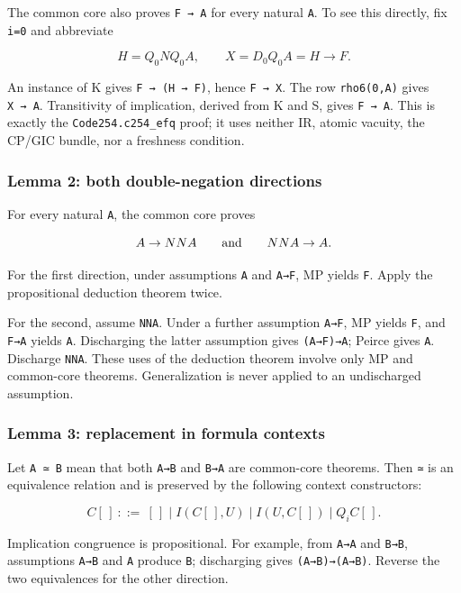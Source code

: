 The common core also proves \texttt{F\ →\ A} for every natural
\texttt{A}. To see this directly, fix \texttt{i=0} and abbreviate

\[
H=Q_0NQ_0A,\qquad X=D_0Q_0A=H\to F.
\]

An instance of K gives \texttt{F\ →\ (H\ →\ F)}, hence \texttt{F\ →\ X}.
The row \texttt{rho6(0,A)} gives \texttt{X\ →\ A}. Transitivity of
implication, derived from K and S, gives \texttt{F\ →\ A}. This is
exactly the \texttt{Code254.c254\_efq} proof; it uses neither IR, atomic
vacuity, the CP/GIC bundle, nor a freshness condition.

\hypertarget{lemma-2-both-double-negation-directions}{%
\subsubsection{Lemma 2: both double-negation
directions}\label{lemma-2-both-double-negation-directions}}

For every natural \texttt{A}, the common core proves

\[
A\to NNA\qquad\hbox{and}\qquad NNA\to A.
\]

For the first direction, under assumptions \texttt{A} and \texttt{A→F},
MP yields \texttt{F}. Apply the propositional deduction theorem twice.

For the second, assume \texttt{NNA}. Under a further assumption
\texttt{A→F}, MP yields \texttt{F}, and \texttt{F→A} yields \texttt{A}.
Discharging the latter assumption gives \texttt{(A→F)→A}; Peirce gives
\texttt{A}. Discharge \texttt{NNA}. These uses of the deduction theorem
involve only MP and common-core theorems. Generalization is never
applied to an undischarged assumption.

\hypertarget{lemma-3-replacement-in-formula-contexts}{%
\subsubsection{Lemma 3: replacement in formula
contexts}\label{lemma-3-replacement-in-formula-contexts}}

Let \texttt{A\ ≃\ B} mean that both \texttt{A→B} and \texttt{B→A} are
common-core theorems. Then \texttt{≃} is an equivalence relation and is
preserved by the following context constructors:

\[
C[\,]\ ::=\ [\,]\mid I(C[\,],U)\mid I(U,C[\,])\mid Q_i C[\,].
\]

Implication congruence is propositional. For example, from
\texttt{A\textquotesingle{}→A} and \texttt{B→B\textquotesingle{}},
assumptions \texttt{A→B} and \texttt{A\textquotesingle{}} produce
\texttt{B\textquotesingle{}}; discharging gives
\texttt{(A→B)→(A\textquotesingle{}→B\textquotesingle{})}. Reverse the
two equivalences for the other direction.

